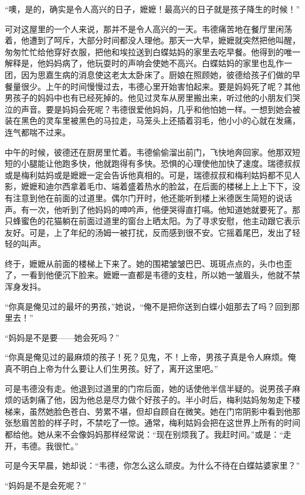 \par “噢，是的，确实是令人高兴的日子，嬷嬷！最高兴的日子就是孩子降生的时候！”
\par 可对这屋里的一个人来说，那并不是令人高兴的一天。韦德痛苦地在餐厅里闲荡着，他遭到了呵斥，大部分时间都没人理他。那天一大早，嬷嬷就突然把他叫醒，匆匆忙忙给他穿好衣服，把他和埃拉送到白蝶姑妈的家里去吃早餐。他得到的唯一解释是，他妈妈病了，他玩耍时的声响会使她不高兴。白蝶姑妈的家里也乱作一团，因为思嘉生病的消息使这老太太卧床了。厨娘在照顾她，彼德给孩子们做的早餐量很少。上午的时间慢慢过去，韦德心里开始害怕起来。要是妈妈死了呢？其他男孩子的妈妈中也有已经死掉的。他见过灵车从房里搬出来，听过他的小朋友们哭泣的声音。要是妈妈会死呢？韦德很爱他妈妈，几乎和他怕她一样。一想到她会被装在黑色的灵车里被黑色的马拉走，马笼头上还插着羽毛，他小小的心就在发痛，连气都喘不过来。
\par 中午的时候，彼德还在厨房里忙着。韦德偷偷溜出前门，飞快地奔回家。他那双短短的小腿能让他跑多快，他就跑得有多快。恐惧的心理使他加快了速度。瑞德叔叔或是梅利姑妈或是嬷嬷一定会告诉他真相的。可是，瑞德叔叔和梅利姑妈都不见人影，嬷嬷和迪尔西拿着毛巾、端着盛着热水的脸盆，在后面的楼梯上上上下下，没有注意到他在前面的过道里。偶尔门开时，他还能听到楼上米德医生简短的说话声。有一次，他听到了他妈妈的呻吟声，他便哭得直打嗝。他知道她就要死了。那只蜂蜜色的花猫躺在前面过道里的窗台上晒太阳。为了寻求安慰，他主动跟它表示友好。可是，上了年纪的汤姆一被打扰，反而感到很不安。它摇着尾巴，发出了轻轻的叫声。
\par 终于，嬷嬷从前面的楼梯上下来了。她的围裙皱皱巴巴、斑斑点点的，头巾也歪了，一看到他便沉下脸来。嬷嬷一直都是韦德的支柱，所以她一皱眉头，他就不禁浑身发抖。
\par “你真是俺见过的最坏的男孩，”她说，“俺不是把你送到白蝶小姐那去了吗？回到那里去！”
\par “妈妈是不是要——她会死吗？”
\par “你真是俺见过的最麻烦的孩子！死？见鬼，不！上帝，男孩子真是令人麻烦。俺真不明白上帝为什么要让人们生男孩。好了，离开这里吧。”
\par 可是韦德没有走。他退到过道里的门帘后面，她的话使他半信半疑的。说男孩子麻烦的话刺痛了他，因为他总是尽力做个好孩子的。半小时后，梅利姑妈匆匆走下楼梯来，虽然她脸色苍白、劳累不堪，但却自顾自在微笑。她在门帘阴影中看到他那张愁眉苦脸的样子时，不禁吃了一惊。通常，梅利姑妈会把在这世界上所有的时间都给他。她从来不会像妈妈那样经常说：“现在别烦我了。我赶时间。”或是：“走开，韦德。我很忙。”
\par 可是今天早晨，她却说：“韦德，你怎么这么顽皮。为什么不待在白蝶姑婆家里？”
\par “妈妈是不是会死呢？”
